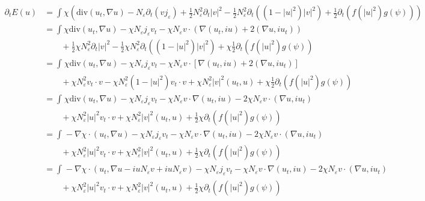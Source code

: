 \documentclass[a4paper]{article}
\renewcommand{\div}{\mathrm{div}}
\begin{document}
\begin{align}
  \partial_t E(u) &= \int \chi \left( \div (u_t, \nabla u) - N_\varepsilon \partial_t(v j_\varepsilon) + \frac{1}{2} N_\varepsilon^2 \partial_t |v|^2
  - \frac{1}{2} N_\varepsilon^2 \partial_t \left( (1-|u|^2) |v|^2 \right) + \frac{1}{2} \partial_t (f(|u|^2)g(\psi)) \right) \nonumber \\
  &= \int \chi \div(u_t,\nabla u) - \chi N_\varepsilon j_\varepsilon v_t - \chi N_\varepsilon v \cdot (\nabla (u_t, iu) + 2 (\nabla u, iu_t)) \nonumber \\
  &\quad \quad + \frac{1}{2} \chi N_\varepsilon^2 \partial_t |v|^2 - \frac{1}{2} \chi N_\varepsilon^2 \partial_t( (1-|u|^2)|v|^2) + \chi
  \frac{1}{2} \partial_t( f(|u|^2) g(\psi)) \nonumber \\
  &= \int_{}^{} \chi \div(u_t, \nabla u) - \chi N_\varepsilon j_\varepsilon v_t - \chi N_\varepsilon v \cdot \left[ \nabla (u_t, iu) + 2 (\nabla
  u, iu_t) \right] \nonumber \\
  &\quad \quad + \chi N_\varepsilon^2 v_t \cdot v - \chi N_\varepsilon^2 (1-|u|^2) v_t \cdot v + \chi N_\varepsilon^2 |v|^2 (u_t, u) + \chi
  \frac{1}{2} \partial_t (f(|u|^2) g(\psi)) \nonumber \\
  &= \int_{}^{} \chi \div (u_t, \nabla u) - \chi N_\varepsilon j_\varepsilon v_t - \chi N_\varepsilon v \cdot \nabla (u_t, iu) - 2 \chi
  N_\varepsilon v \cdot (\nabla u, iu_t) \nonumber \\
  &\quad \quad + \chi N_\varepsilon^2 |u|^2 v_t \cdot v + \chi N_\varepsilon^2 |v|^2 (u_t, u) + \frac{1}{2} \chi \partial_t (f(|u|^2) g(\psi)) \nonumber \\
  &= \int_{}^{} - \nabla \chi \cdot (u_t, \nabla u) - \chi N_\varepsilon j_\varepsilon v_t - \chi N_\varepsilon v \cdot \nabla (u_t, iu) - 2 \chi
  N_\varepsilon v \cdot (\nabla u, iu_t) \nonumber \\
  &\quad \quad + \chi N_\varepsilon^2 |u|^2 v_t \cdot v + \chi N_\varepsilon^2 |v|^2 (u_t, u) + \frac{1}{2} \chi \partial_t (f(|u|^2) g(\psi)) \nonumber \\
  &= \int_{}^{} - \nabla \chi \cdot ( u_t, \nabla u - iu N_\varepsilon v + iu N_\varepsilon v) - \chi N_\varepsilon j_\varepsilon v_t - \chi
  N_\varepsilon v \cdot \nabla (u_t, iu) - 2 \chi
  N_\varepsilon v \cdot (\nabla u, iu_t) \nonumber \\
  &\quad \quad + \chi N_\varepsilon^2 |u|^2 v_t \cdot v + \chi N_\varepsilon^2 |v|^2 (u_t, u) + \frac{1}{2} \chi \partial_t (f(|u|^2) g(\psi)) \nonumber \\

\end{align}
\end{document}
